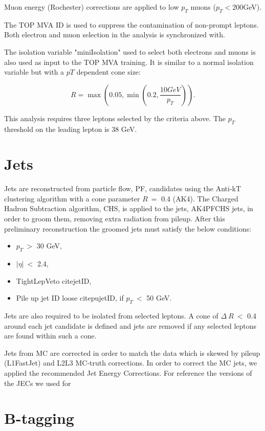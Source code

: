 Muon energy (Rochester) corrections are applied to low $p_T$ muons ($p_T<$200GeV). 

The TOP MVA ID is used to suppress the contamination of non-prompt leptons. Both electron and muon selection in the analysis is synchronized with.

The isolation variable "miniIsolation" used to select both electrons and muons is also used as input to the TOP MVA training. It is similar to a normal isolation variable but with a $pT$ dependent cone size:

\begin{equation}
R = \max (0.05, \min(0.2, \frac{10GeV}{p_T})).
\end{equation}

This analysis requires three leptons selected by the criteria above. The $p_{T}$ threshold on the leading lepton is 38 GeV.
\section{Jets}
\label{sec:Jets}

Jets are reconstructed from particle flow, PF, candidates using the Anti-kT clustering algorithm with a cone parameter $R~=$ 0.4 (AK4). The Charged Hadron Subtraction algorithm, CHS, is applied to the jets, AK4PFCHS jets, in order to groom them, removing extra radiation from pileup. After this preliminary reconstruction the groomed jets must satisfy the below conditions:


\begin{itemize}
\item $p_{T}~>$ 30 GeV,
\item $|\eta|~<$ 2.4,
\item TightLepVeto cite{jetID},
\item Pile up jet ID loose cite{pujetID}, if $p_{T}~<$ 50 GeV.
\end{itemize}

Jets are also required to be isolated from selected leptons. A cone of $\Delta~R~<$ 0.4 around each jet candidate is defined and jets are removed if any selected leptons are found within such a cone.  

Jets from MC are corrected in order to match the data which is skewed by pileup (L1FastJet) and L2L3 MC-truth corrections. In order to correct the MC jets, we applied the recommended Jet Energy Corrections. For reference the versions of the JECs we used for
\section{B-tagging}
\label{sec:Btag}